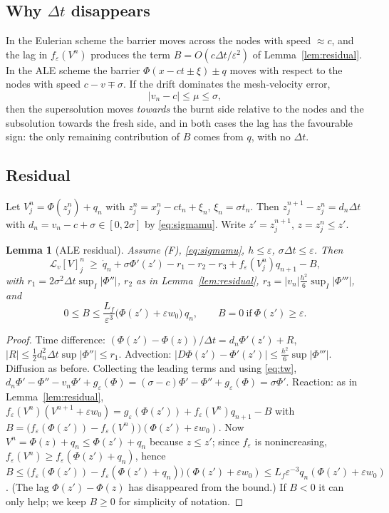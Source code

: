 \documentclass[11pt]{amsart}
\newtheorem{lemma}[theorem]{Lemma}
\theoremstyle{remark}
\newcommand{\ve}{\varepsilon}
\newcommand{\Lop}{\mathcal{L}}
\begin{document}
\subsection*{Why $\Delta t$ disappears}
In the Eulerian scheme the barrier moves across the nodes with speed $\approx c$,
and the lag in $f_\ve(V^n)$ produces the term $B=O(c\Delta t/\ve^2)$ of
Lemma~\ref{lem:residual}. In the ALE scheme the barrier
$\Phi(x-ct\pm\xi)\pm q$ moves with respect to the nodes with speed
$c-v\mp\sigma$. If the drift dominates the mesh-velocity error,
\begin{equation}\label{eq:sigmamu}
|v_n-c|\le\mu\le\sigma ,
\end{equation}
then the supersolution moves \emph{towards} the burnt side relative to the
nodes and the subsolution towards the fresh side, and in both cases the lag
has the favourable sign: the only remaining contribution of $B$ comes from
$q$, with no $\Delta t$.

\subsection*{Residual}
Let $V^n_j=\Phi(z^n_j)+q_n$ with $z^n_j=x^n_j-ct_n+\xi_n$, $\xi_n=\sigma t_n$.
Then $z^{n+1}_j-z^n_j=d_n\Delta t$ with $d_n=v_n-c+\sigma\in[0,2\sigma]$ by
\eqref{eq:sigmamu}. Write $z'=z^{n+1}_j$, $z=z^n_j\le z'$.

\begin{lemma}[ALE residual]\label{lem:ale}
Assume (F), \eqref{eq:sigmamu}, $h\le\ve$, $\sigma\Delta t\le\ve$. Then
\[
\Lop_v[V]^n_j\ \ge\ \dot q_n+\sigma\Phi'(z')-r_1-r_2-r_3+f_\ve(V^n_j)q_{n+1}-B,
\]
with $r_1=2\sigma^2\Delta t\sup_I|\Phi''|$, $r_2$ as in Lemma~\ref{lem:residual},
$r_3=|v_n|\frac{h^2}{6}\sup_I|\Phi'''|$, and
\[
0\le B\le\frac{L_f}{\ve^3}\big(\Phi(z')+\ve w_0\big)\,q_n ,\qquad B=0\ \text{if}\ \Phi(z')\ge\ve .
\]
\end{lemma}

\begin{proof}
Time difference: $(\Phi(z')-\Phi(z))/\Delta t=d_n\Phi'(z')+R$,
$|R|\le\frac12d_n^2\Delta t\sup|\Phi''|\le r_1$. Advection:
$|D\Phi(z')-\Phi'(z')|\le\frac{h^2}6\sup|\Phi'''|$. Diffusion as before. Collecting the
leading terms and using \eqref{eq:tw},
$d_n\Phi'-\Phi''-v_n\Phi'+g_\ve(\Phi)=(\sigma-c)\Phi'-\Phi''+g_\ve(\Phi)=\sigma\Phi'$. Reaction: as in Lemma~\ref{lem:residual},
$f_\ve(V^n)(V^{n+1}+\ve w_0)=g_\ve(\Phi(z'))+f_\ve(V^n)q_{n+1}-B$ with
$B=\big(f_\ve(\Phi(z'))-f_\ve(V^n)\big)(\Phi(z')+\ve w_0)$. Now
$V^n=\Phi(z)+q_n\le\Phi(z')+q_n$ because $z\le z'$; since $f_\ve$ is
nonincreasing, $f_\ve(V^n)\ge f_\ve(\Phi(z')+q_n)$, hence
$B\le\big(f_\ve(\Phi(z'))-f_\ve(\Phi(z')+q_n)\big)(\Phi(z')+\ve w_0)\le L_f\ve^{-3}q_n(\Phi(z')+\ve w_0)$.
(The lag $\Phi(z')-\Phi(z)$ has disappeared from the bound.) If $B<0$ it can
only help; we keep $B\ge0$ for simplicity of notation.
\end{proof}
\end{document}

